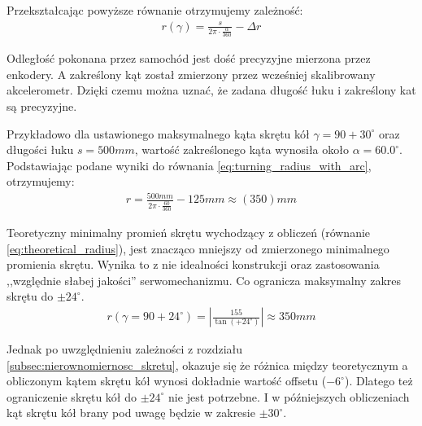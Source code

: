             Przekształcając powyższe równanie otrzymujemy zależność:
            \begin{gather}
                r(\gamma) = \frac{s}{2\pi \cdot \frac{\alpha}{360}} - \Delta r
                \label{eq:turning_radius_with_arc}
            \end{gather}

            Odległość pokonana przez samochód jest dość precyzyjne mierzona przez enkodery.
            A zakreślony kąt został zmierzony przez wcześniej skalibrowany akcelerometr.
            Dzięki czemu można uznać, że zadana długość łuku i zakreślony kat są precyzyjne.

            Przykładowo dla ustawionego maksymalnego kąta skrętu kół $\gamma = 90 + 30^\circ$ oraz długości łuku $s = 500mm$, wartość zakreślonego kąta wynosiła około $\alpha = 60.0^\circ$.
            Podstawiając podane wyniki do równania \eqref{eq:turning_radius_with_arc}, otrzymujemy:
            \begin{gather}
                r = \frac{500mm}{2\pi \cdot \frac{60}{360}} - 125mm \approx (350)mm
            \end{gather}


            Teoretyczny minimalny promień skrętu wychodzący z obliczeń (równanie \eqref{eq:theoretical_radius}), jest znacząco mniejszy od zmierzonego minimalnego promienia skrętu.
            Wynika to z nie idealności konstrukcji oraz zastosowania ,,względnie słabej jakości'' serwomechanizmu.
            Co ogranicza maksymalny zakres skrętu do $\pm 24^\circ$.
            \begin{gather}
                r(\gamma = 90 + 24^\circ) = \left|\frac{155}{\tan(+ 24^\circ)}\right| \approx 350mm
            \end{gather}

            Jednak po uwzględnieniu zależności z rozdziału \ref{subsec:nierownomiernosc_skretu}, okazuje się że różnica między teoretycznym a obliczonym kątem skrętu kół wynosi dokładnie wartość offsetu ($-6^\circ$).
            Dlatego też ograniczenie skrętu kół do $\pm 24^\circ$ nie jest potrzebne. 
            I w późniejszych obliczeniach kąt skrętu kół brany pod uwagę będzie w zakresie $\pm 30^\circ$.


